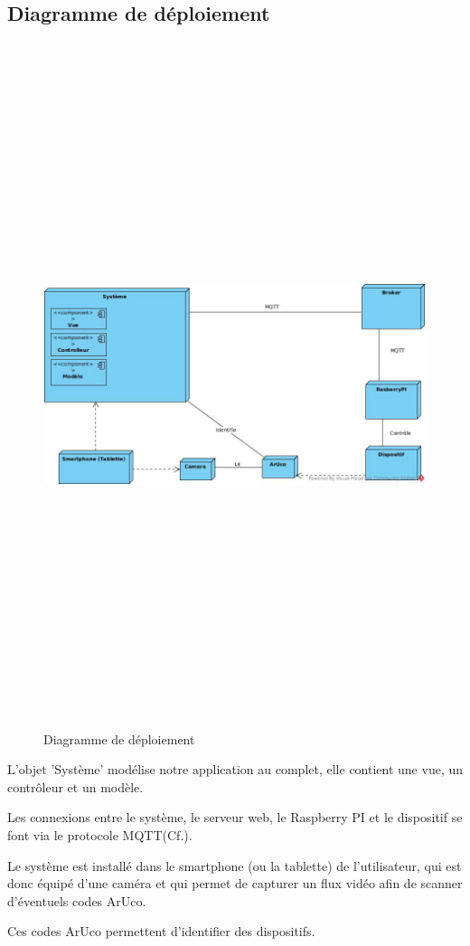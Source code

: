 \documentclass[12pt,a4paper]{article}
\begin{document}
\subsection{Diagramme de déploiement}
\begin{figure}[!ht]
  \centering
  \includegraphics[width = 15cm,height=20cm]{DDep.jpg}
  \caption{Diagramme de déploiement}
\end{figure}
\newpage
\par
L'objet 'Système' modélise notre application au complet, elle contient une vue, un contrôleur et un modèle.\par
Les connexions entre le système, le serveur web, le Raspberry PI et le dispositif se font via le protocole MQTT(Cf.\cite{Ref21}).\par
Le système est installé dans le smartphone (ou la tablette) de l'utilisateur, qui est donc équipé d'une caméra et qui permet de capturer un flux vidéo afin de scanner d'éventuels codes ArUco.\par
Ces codes ArUco permettent d'identifier des dispositifs.
\end{document}
